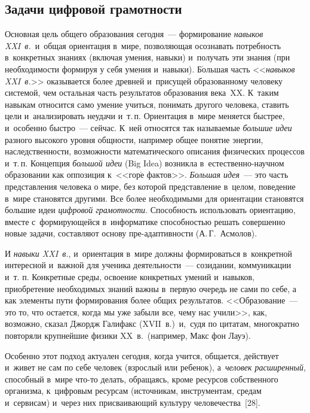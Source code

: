 \begin{multicols}{2}
\section{Задачи цифровой грамотности}

   Основная цель общего образования сегодня~--- формирование 
\textit{навыков XXI~в.}\ и~общая ориентация в~мире, позволяющая 
осознавать потребность в~конкретных знаниях (включая умения, навыки) 
и~получать эти знания (при необходимости формируя у себя умения и~навыки). 
Б$\acute{\mbox{о}}$льшая часть <<\textit{навыков XXI~в.}>>  оказывается 
более древней и~присущей образованному человеку системой, чем остальная 
часть результатов образования века~XX. К~таким навыкам относится само 
умение учиться, понимать другого человека, ставить цели и~анализировать 
неудачи и~т.\,п. Ориентация в~мире меняется быстрее, и~особенно быст\-ро~--- 
сейчас. К~ней относятся так называемые \textit{большие идеи} разного 
высокого уровня общности, например общее понятие энергии, 
наследственности, возможности математического описания физических 
процессов и~т.\,п. Концепция \textit{большой идеи} (Big Idea) возникла 
в~ес\-тест\-вен\-но-на\-уч\-ном образовании как оппозиция 
к~<<гор$\acute{\mbox{е}}$ фактов>>. \textit{Большая идея}~--- это часть 
представления человека о мире, без которой представление в~целом, 
поведение в~мире становятся другими. Все более необходимыми для 
ориентации становятся большие идеи \textit{цифровой грамотности}. 
Способность использовать ориентацию, вместе с~формирующейся 
в~информатике способностью решать совершенно новые задачи, составляют 
основу 
 пре-адап\-тив\-ности (А.\,Г.~Асмолов). 
  
  И \textit{навыки XXI~в.}, и~ориентация в~мире должны формироваться 
  в~конкретной интересной и~важной для ученика деятельности~--- созидании, 
коммуникации и~т. п. Конкретные среды, освоение конкретных умений 
и~навыков, приобретение необходимых знаний важны в~первую очередь не 
сами по себе, а как элементы пути формирования более общих результатов. 
<<Образование~--- это то, что остается, когда мы уже забыли все, чему нас 
учили>>, как, возможно, сказал Джордж Галифакс (XVII~в.)\ и,~судя по 
цитатам, многократно повторяли крупнейшие физики XX~в.\ (например, 
Макс фон Лауэ).
  
  Особенно этот подход актуален сегодня, когда учится, общается, действует и~живет 
  не сам по себе человек (взрослый или ребенок), а~\textit{человек 
расширенный}, способный в~мире что-то делать, обращаясь, кроме ресурсов 
собственного организма, к~циф\-ро\-вым ресурсам (источникам, инструментам, 
средам и~сервисам) и~через них присваивающий культуру человечества~[28].
  

\end{multicols}
